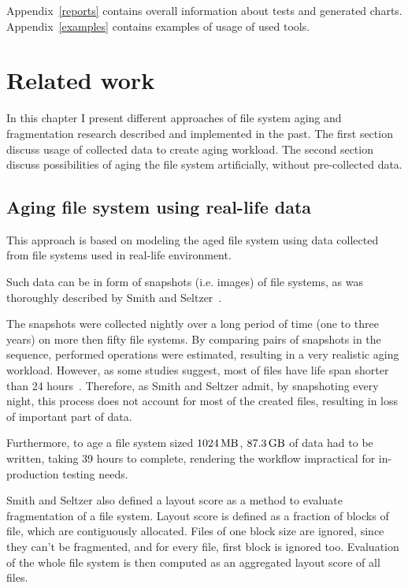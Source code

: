 \documentclass[
  color, %
  table, %
  lof,   %
  lot,   %
]{fithesis3}
\begin{document}
Appendix~\ref{reports} contains overall information about tests and generated charts. Appendix~\ref{examples} contains examples of usage of used tools.  

\chapter{Related work}
\label{related}
In this chapter I present different approaches of file system aging and fragmentation research described and implemented in the past. The first section discuss usage of collected data to create aging workload. The second section discuss possibilities of aging the file system artificially, without pre-collected data.

\section{Aging file system using real-life data}
This approach is based on modeling the aged file system using data collected from file systems used in real-life environment.

Such data can be in form of snapshots (i.e. images) of file systems, as was thoroughly described by Smith and Seltzer~\cite{Smith:1997:FSA:258623.258689}.

The snapshots were collected nightly over a long period of time (one to three years) on more then fifty file systems. By comparing pairs of snapshots in the sequence, performed operations were estimated, resulting in a very realistic aging workload. However, as some studies suggest, most of files have life span shorter than 24 hours~\cite{Ousterhout:1985:TAU:323647.323631}. Therefore, as Smith and Seltzer admit, by snapshoting every night, this process does not account for most of the created files, resulting in loss of important part of data.

Furthermore, to age a file system sized $\SI{1024}{\mega\byte}$, $\SI{87.3}{\giga\byte}$ of data had to be written, taking 39 hours to complete, rendering the workflow impractical for in-production testing needs.

Smith and Seltzer also defined a layout score as a method to evaluate fragmentation of a file system. Layout score is defined as a fraction of blocks of file, which are contiguously allocated. Files of one block size are ignored, since they can't be fragmented, and for every file, first block is ignored too. Evaluation of the whole file system is then computed as an aggregated layout score of all files.
\end{document}
